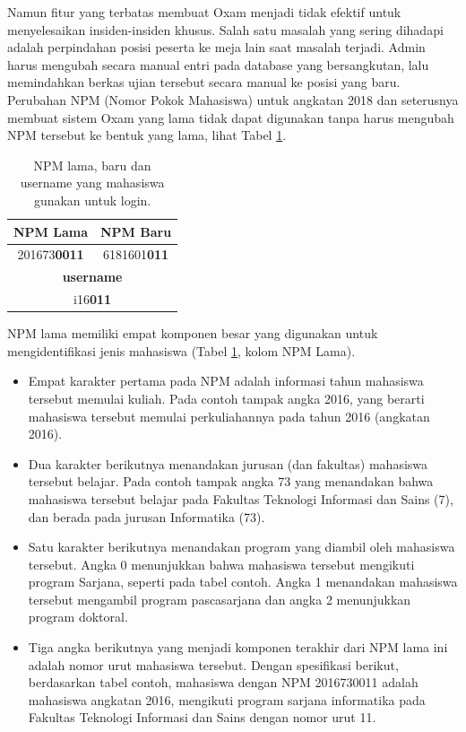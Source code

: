Namun fitur yang terbatas membuat Oxam menjadi tidak efektif untuk menyelesaikan
insiden-insiden khusus. Salah satu masalah yang sering dihadapi adalah
perpindahan posisi peserta ke meja lain saat masalah terjadi. Admin harus
mengubah secara manual entri pada database yang bersangkutan, lalu memindahkan
berkas ujian tersebut secara manual ke posisi yang baru. Perubahan NPM (Nomor
Pokok Mahasiswa) untuk angkatan 2018 dan seterusnya membuat sistem Oxam yang
lama tidak dapat digunakan tanpa harus mengubah NPM tersebut ke bentuk yang
lama, lihat Tabel \ref{tab:table-npm}. 

\begin{table}[H]
    \centering
    \def\arraystretch{2}
    \begin{tabular}{|c|c|}
        \hline
        \textbf{NPM Lama} & \textbf{NPM Baru} \\
        \hline
        201673\textbf{0011} & 6181601\textbf{011} \\
        \hline
        \multicolumn{2}{|c|}{\textbf{username}} \\
        \hline
        \multicolumn{2}{|c|}{i16\textbf{011}} \\
        \hline
    \end{tabular}
    \caption{NPM lama, baru dan username yang mahasiswa gunakan untuk login.}
    \label{tab:table-npm}
\end{table}

NPM lama memiliki empat komponen besar yang digunakan untuk mengidentifikasi
jenis mahasiswa (Tabel \ref{tab:table-npm}, kolom NPM Lama). 
\begin{itemize}
    \item Empat karakter pertama pada NPM adalah informasi tahun mahasiswa
    tersebut memulai kuliah. Pada contoh tampak angka 2016, yang berarti
    mahasiswa tersebut memulai perkuliahannya pada tahun 2016 (angkatan 2016). 
    
    \item Dua karakter berikutnya menandakan jurusan (dan fakultas) mahasiswa
    tersebut belajar. Pada contoh tampak angka 73 yang menandakan bahwa
    mahasiswa tersebut belajar pada Fakultas Teknologi Informasi dan Sains (7),
    dan berada pada jurusan Informatika (73). 
    
    \item Satu karakter berikutnya menandakan program yang diambil oleh
    mahasiswa tersebut. Angka 0 menunjukkan bahwa mahasiswa tersebut mengikuti
    program Sarjana, seperti pada tabel contoh. Angka 1 menandakan mahasiswa
    tersebut mengambil program pascasarjana dan angka 2 menunjukkan program
    doktoral. 
    
    \item Tiga angka berikutnya yang menjadi komponen terakhir dari NPM lama ini
    adalah nomor urut mahasiswa tersebut. Dengan spesifikasi berikut,
    berdasarkan tabel contoh, mahasiswa dengan NPM 2016730011 adalah mahasiswa
    angkatan 2016, mengikuti program sarjana informatika pada Fakultas Teknologi
    Informasi dan Sains dengan nomor urut 11.
\end{itemize}

